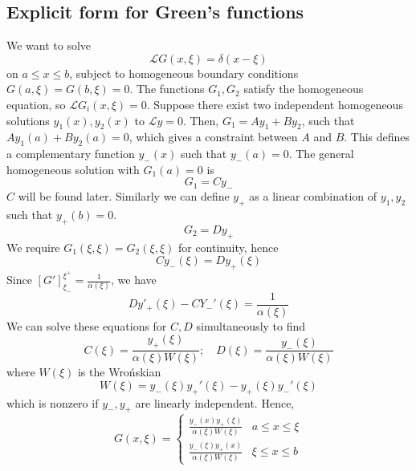 \subsection{Explicit form for Green's functions}
We want to solve
\[
	\mathcal L G(x,\xi) = \delta(x-\xi)
\]
on \( a \leq x \leq b \), subject to homogeneous boundary conditions \( G(a,\xi) = G(b,\xi) = 0 \).
The functions \( G_1, G_2 \) satisfy the homogeneous equation, so \( \mathcal L G_i(x,\xi) = 0 \).
Suppose there exist two independent homogeneous solutions \( y_1(x), y_2(x) \) to \( \mathcal L y = 0 \).
Then, \( G_1 = A y_1 + B y_2 \), such that \( A y_1(a) + B y_2(a) = 0 \), which gives a constraint between \( A \) and \( B \).
This defines a complementary function \( y_-(x) \) such that \( y_-(a) = 0 \).
The general homogeneous solution with \( G_1(a) = 0 \) is
\[
	G_1 = C y_-
\]
\( C \) will be found later.
Similarly we can define \( y_+ \) as a linear combination of \( y_1, y_2 \) such that \( y_+(b) = 0 \).
\[
	G_2 = D y_+
\]
We require \( G_1(\xi, \xi) = G_2(\xi, \xi) \) for continuity, hence
\[
	C y_-(\xi) = D y_+(\xi)
\]
Since \( [G']_{\xi_-}^{\xi^+} = \frac{1}{\alpha(\xi)} \), we have
\[
	Dy'_+(\xi) - C Y_-'(\xi) = \frac{1}{\alpha(\xi)}
\]
We can solve these equations for \( C, D \) simultaneously to find
\[
	C(\xi) = \frac{y_+(\xi)}{\alpha(\xi)W(\xi)};\quad D(\xi) = \frac{y_-(\xi)}{\alpha(\xi)W(\xi)}
\]
where \( W(\xi) \) is the Wro\'nskian
\[
	W(\xi) = y_-(\xi) y_+'(\xi) - y_+(\xi) y_-'(\xi)
\]
which is nonzero if \( y_-, y_+ \) are linearly independent.
Hence,
\[
	G(x,\xi) = \begin{cases}
		\frac{y_-(x) y_+(\xi)}{\alpha(\xi)W(\xi)} & a \leq x \leq \xi \\
		\frac{y_-(\xi) y_+(x)}{\alpha(\xi)W(\xi)} & \xi \leq x \leq b
	\end{cases}
\]

